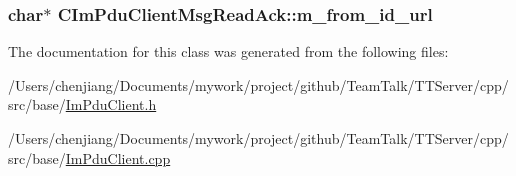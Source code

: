 \subsubsection[{m\+\_\+from\+\_\+id\+\_\+url}]{\setlength{\rightskip}{0pt plus 5cm}char$\ast$ C\+Im\+Pdu\+Client\+Msg\+Read\+Ack\+::m\+\_\+from\+\_\+id\+\_\+url\hspace{0.3cm}{\ttfamily [private]}}\label{class_c_im_pdu_client_msg_read_ack_ae9e280106b5dc50dfd32591470b29723}


The documentation for this class was generated from the following files\+:\begin{DoxyCompactItemize}
\item 
/\+Users/chenjiang/\+Documents/mywork/project/github/\+Team\+Talk/\+T\+T\+Server/cpp/src/base/\hyperlink{_im_pdu_client_8h}{Im\+Pdu\+Client.\+h}\item 
/\+Users/chenjiang/\+Documents/mywork/project/github/\+Team\+Talk/\+T\+T\+Server/cpp/src/base/\hyperlink{_im_pdu_client_8cpp}{Im\+Pdu\+Client.\+cpp}\end{DoxyCompactItemize}

